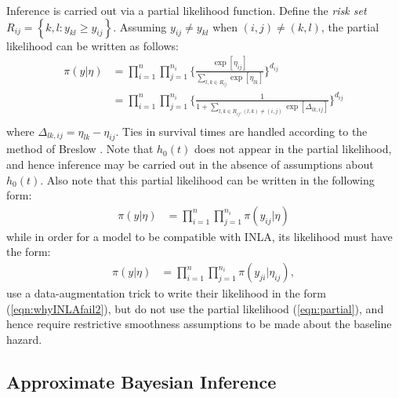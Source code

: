 \documentclass[]{article}
\begin{document}
Inference is carried out via a partial likelihood function. Define the \textit{risk set} $R_{ij} = \left\{k,l : y_{kl} \geq y_{ij}\right\}$. Assuming $y_{ij} \neq y_{kl}$ when $(i,j) \neq (k,l)$, the partial likelihood can be written as follows: 
\begin{equation}\begin{aligned}\label{eqn:partial}
\pi(y|\eta) &= \prod_{i=1}^{n}\prod_{j=1}^{n_{i}} \bigg\{\frac{\exp[\eta_{ij}]}{{\sum_{l,k\in R_{ij}}^{}\exp[\eta_{lk}]}}\bigg \}^{d_{ij}} \\
&= \prod_{i=1}^{n}\prod_{j=1}^{n_{i}} \bigg\{\frac{1}{{1 + \sum_{l,k\in R_{ij} , (l,k) \neq (i,j)}\exp[\Delta_{lk,ij}]}}\bigg \}^{d_{ij}} \\
\end{aligned}\end{equation}
where $\Delta_{lk,ij} = \eta_{lk} - \eta_{ij}$. Ties in survival times are handled according to the method of Breslow \citep{Breslow}. Note that $h_{0}(t)$ does not appear in the partial likelihood, and hence inference may be carried out in the absence of assumptions about $h_{0}(t)$. Also note that this partial likelihood can be written in the following form:
\begin{equation}\begin{aligned}\label{eqn:whyINLAfail1}
\pi(y|\eta) &= \prod_{i=1}^{n}\prod_{j=1}^{n_{i}} \pi(y_{ij}|\eta)
\end{aligned}\end{equation}
while in order for a model to be compatible with INLA, its likelihood must have the form:
\begin{equation}\begin{aligned}\label{eqn:whyINLAfail2}
\pi(y|\eta) &= \prod_{i=1}^{n}\prod_{j=1}^{n_{i}} \pi(y_{ji}|\eta_{ij}),
\end{aligned}\end{equation}
\citet{inlacoxph} use a data-augmentation trick to write their likelihood in the form (\ref{eqn:whyINLAfail2}), but do not use the partial likelihood (\ref{eqn:partial}), and hence require restrictive smoothness assumptions to be made about the baseline hazard.

\subsection{Approximate Bayesian Inference}
\end{document}
